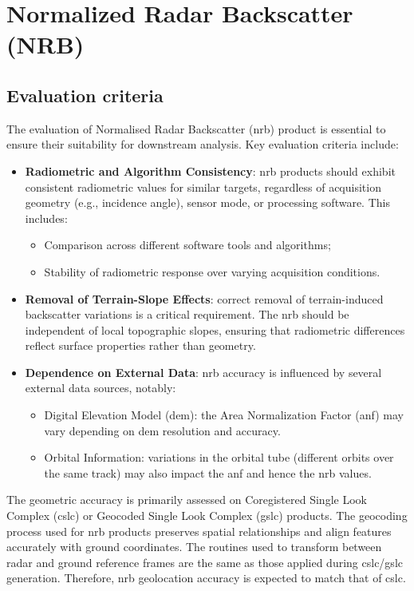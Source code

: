 \section{Normalized Radar Backscatter (NRB)}
\label{sec:nrb}

\subsection{Evaluation criteria}
\label{sec:nrb_criteria}
The evaluation of Normalised Radar Backscatter (\acs{nrb}) product is essential to ensure their suitability for downstream analysis. Key evaluation criteria include:

\begin{itemize}
    \item \textbf{Radiometric and Algorithm Consistency}: \acs{nrb} products should exhibit consistent radiometric values for similar targets, regardless of acquisition geometry (e.g., incidence angle), sensor mode, or processing software. This includes:
    \begin{itemize}
        \item Comparison across different software tools and algorithms;
        \item Stability of radiometric response over varying acquisition conditions.
    \end{itemize}
    \item \textbf{Removal of Terrain-Slope Effects}: correct removal of terrain-induced backscatter variations is a critical requirement. The \acs{nrb} should be independent of local topographic slopes, ensuring that radiometric differences reflect surface properties rather than geometry.  
    \item \textbf{Dependence on External Data}: \acs{nrb} accuracy is influenced by several external data sources, notably:
    \begin{itemize}
        \item Digital Elevation Model (\acs{dem}): the Area Normalization Factor (\acs{anf}) may vary depending on \acs{dem} resolution and accuracy.
        \item Orbital Information: variations in the orbital tube (different orbits over the same track) may also impact the \acs{anf} and hence the \acs{nrb} values.
    \end{itemize}
\end{itemize}

The geometric accuracy is primarily assessed on Coregistered Single Look Complex (\acs{cslc}) or Geocoded Single Look Complex (\acs{gslc}) products. The geocoding process used for \acs{nrb} products preserves spatial relationships and align features accurately with ground coordinates. The routines used to transform between radar and ground reference frames are the same as those applied during \acs{cslc}/\acs{gslc} generation. Therefore, \acs{nrb} geolocation accuracy is expected to match that of \acs{cslc}.

